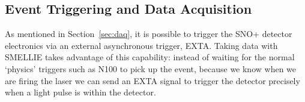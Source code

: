 \begin{figure}
    \centering
    \caption[]{}
    \label{fig:caen_trace_comparison}
\end{figure}

\subsection{Event Triggering and Data Acquisition}\label{sec:smellie_triggering_daq}
As mentioned in Section~\ref{sec:daq}, it is possible to trigger the SNO+ detector electronics via an external asynchronous trigger, EXTA. Taking data with SMELLIE takes advantage of this capability: instead of waiting for the normal `physics' triggers such as N100 to pick up the event, because we know when we are firing the laser we can send an EXTA signal to trigger the detector precisely when a light pulse is within the detector.



